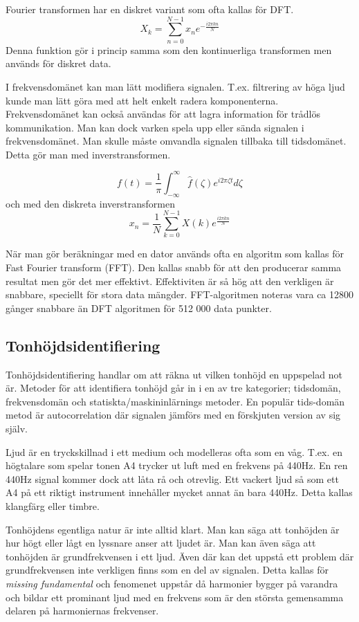 Fourier transformen har en diskret variant som ofta kallas för DFT. 
$$X_k = \sum_{n=0}^{N-1} x_ne^{-\frac{i2\pi kn}{N}}$$
Denna funktion gör i princip samma som den kontinuerliga transformen men används för diskret data.

I frekvensdomänet kan man lätt modifiera signalen. T.ex. filtrering av höga ljud kunde man lätt göra med att helt enkelt radera komponenterna. Frekvensdomänet kan också användas för att lagra information för trådlös kommunikation. Man kan dock varken spela upp eller sända signalen i frekvensdomänet. Man skulle måste omvandla signalen tillbaka till tidsdomänet. Detta gör man med inverstransformen. 

$$ f(t) = \frac{1}{\pi}\int_{-\infty}^{\infty} \hat{f}(\zeta)e^{i2\pi\zeta t} d\zeta$$
och med den diskreta inverstransformen
$$ x_n = \frac{1}{N}\sum_{k=0}^{N-1} X(k)e^{\frac{i2\pi kn}{N}}$$

När man gör beräkningar med en dator används ofta en algoritm som kallas för Fast Fourier transform (FFT). Den kallas snabb för att den producerar samma resultat men  gör det mer effektivt. Effektiviten är så hög att den verkligen är snabbare, speciellt för stora data mängder. FFT-algoritmen noteras vara ca 12800 gånger snabbare än DFT algoritmen för 512 000 data punkter.  
\subsection*{Tonhöjdsidentifiering}
Tonhöjdsidentifiering handlar om att räkna ut vilken tonhöjd en uppspelad not är. Metoder för att identifiera tonhöjd går in i en av tre kategorier; tidsdomän, frekvensdomän och statiskta/maskininlärnings metoder. En populär tids-domän metod är autocorrelation där signalen jämförs med en förskjuten version av sig själv. 

Ljud är en tryckskillnad i ett medium och modelleras ofta som en våg. T.ex. en högtalare som spelar tonen A4 trycker ut luft med en frekvens på 440Hz. En ren 440Hz signal kommer dock att låta rå och otrevlig. Ett vackert ljud så som ett A4 på ett riktigt instrument innehåller mycket annat än bara 440Hz. Detta kallas klangfärg eller timbre.

Tonhöjdens egentliga natur är inte alltid klart. Man kan säga att tonhöjden är hur högt eller lågt en lyssnare anser att ljudet är. Man kan även säga att tonhöjden är grundfrekvensen i ett ljud. Även där kan det uppstå ett problem där grundfrekvensen inte verkligen finns som en del av signalen. Detta kallas för \textit{missing fundamental} och fenomenet uppstår då harmonier bygger på varandra och bildar ett prominant ljud med en frekvens som är den största gemensamma delaren på harmoniernas frekvenser.

